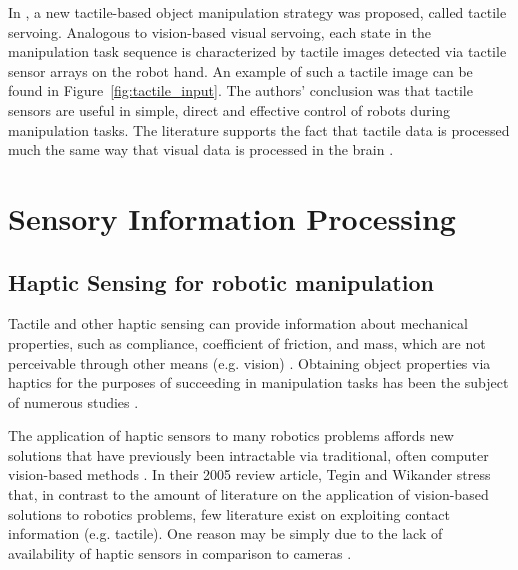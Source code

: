 In \cite{sikka1994tactile}, a new tactile-based object manipulation strategy was proposed, called tactile servoing.
Analogous to vision-based visual servoing, each state in the manipulation task sequence is characterized by tactile images detected via tactile sensor arrays on the robot hand.
An example of such a tactile image can be found in Figure~\ref{fig:tactile_input}.
The authors' conclusion was that tactile sensors are useful in simple, direct and effective control of robots during manipulation tasks.
The literature supports the fact that tactile data is processed much the same way that visual data is processed in the brain \cite{johansson2001eye, scilingo2004perception}.

\section{Sensory Information Processing}


\subsection{Haptic Sensing for robotic manipulation}


Tactile and other haptic sensing can provide information about mechanical properties, such as compliance, coefficient of friction, and mass, which are not perceivable through other means (e.g. vision) \cite{howe1993tactile}.
Obtaining object properties via haptics for the purposes of succeeding in manipulation tasks has been the subject of numerous studies \cite{Heidemann2004, Detry2011, lepora2012embodied}.

The application of haptic sensors to many robotics problems affords new solutions that have previously been intractable via traditional, often computer vision-based methods \cite{lee1999review}.
In their 2005 review article, Tegin and Wikander \cite{tegin2005tactile} stress that, in contrast to the amount of literature on the application of vision-based solutions to robotics problems, few literature exist on exploiting contact information (e.g. tactile).
One reason may be simply due to the lack of availability of haptic sensors in comparison to cameras \cite{howe1993tactile}.


